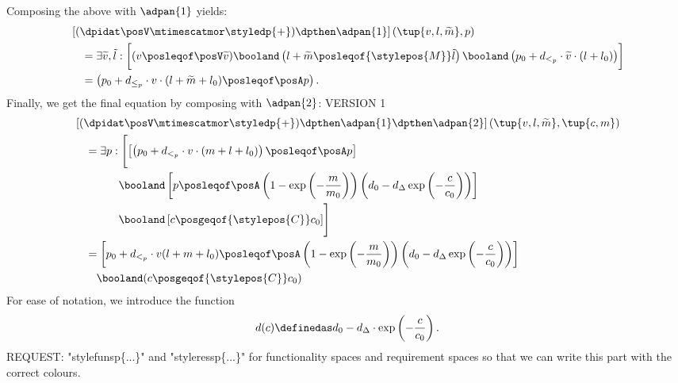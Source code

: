 {\begin{example}
    Composing the above with $\adpan{1}$ yields:  
    \begin{align}
        &\left[(\dpidat\posV \mtimescatmor \styledp{+})\dpthen \adpan{1}\right]\left(\tup{v, l , \widetilde{m}}, p\right) \notag\\
        & \quad = \exists \widetilde{v}, \tilde{l}:\bigg[(v \posleqof\posV \widetilde{v})\booland\left(l + \widetilde{m} \posleqof{\stylepos{M}} \tilde{l} \right) \booland\left(p_0 + d_{<_p} \cdot \widetilde{v} \cdot (l + l_0) \right)\biggr]\\
        &\quad = \left(p_0 + d_{\le_p} \cdot v \cdot (l + \widetilde{m} + l_0) \posleqof\posA  p\right)
    .\end{align} 
    Finally, we get the final equation by composing with $\adpan{2}$: VERSION 1
    \begin{alignat}{2}
        & \left[(\dpidat\posV \mtimescatmor \styledp{+})\dpthen \adpan{1} \dpthen \adpan{2}\right] \left( \tup{v, l,\widetilde{m}}, \tup{c,m}\right) \\
        &\quad  = \exists p : \Biggl[\left[\left( p_0 + d_{<_p} \cdot v \cdot(m + l + l_0) \right) \posleqof\posA p\right] \notag \\
        & \qquad\qquad\booland  \left[ p \posleqof\posA \left(1 - \exp\left(-\frac{m}{m_0}\right)\right)\left(d_0 - d_\Delta \exp\left(-\frac{c}{c_0}\right)\right)\right] \notag \\
        & \qquad\qquad \booland \left[ c \posgeqof{\stylepos{C}} c_0\right]\Biggr]\\
        & \quad = \left[p_0 + d_{<_p}\cdot v (l + m + l_0) \posleqof\posA \left(1 - \exp\left(-\frac{m}{m_0}\right)\right) \left(d_0 - d_\Delta \exp\left( - \frac{c}{c_0}\right)\right)\right] \notag \\
        & \qquad \booland (c \posgeqof{\stylepos{C}}c_0)
    \end{alignat}
    For ease of notation, we introduce the function
    \begin{equation}
        d(c) \definedas d_0 - d_\Delta \cdot \exp\left(-\frac{c}{c_0}\right)
    .\end{equation}
    REQUEST: "stylefunsp\{...\}" and "styleressp\{...\}" for functionality spaces and requirement spaces so that we can write this part with the correct colours.


\end{example}}
